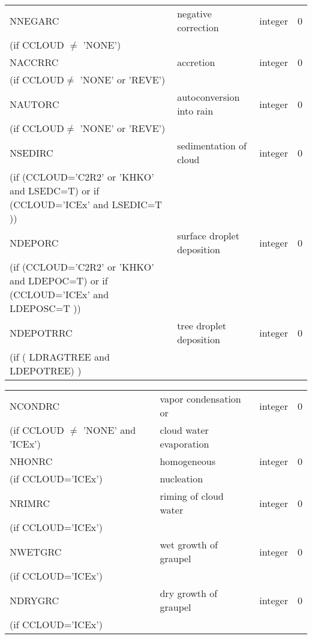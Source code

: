 \begin{center}
\begin{tabular} {|p{8cm}|p{4cm}|>{\centering}p{1.5cm}|p{1.5cm}<{\centering}|}
NNEGARC   & negative correction & integer  &  0 \index{NREVARC!\innam{NAM\_BU\_RRC}}\\
(if CCLOUD $\neq$ 'NONE') & &   &  \\\hline
NACCRRC  & accretion & integer  &  0 \index{NACCRC!\innam{NAM\_BU\_RRC}}\\
(if CCLOUD$ \neq$ 'NONE' or 'REVE') & &   &  \\\hline
NAUTORC  & autoconversion into rain & integer  &  0 \index{NAUTORC!\innam{NAM\_BU\_RRC}}\\
(if CCLOUD$ \neq$ 'NONE' or 'REVE') & &   &  \\\hline
NSEDIRC  & sedimentation of cloud   & integer  &  0 \index{NSEDIRC!\innam{NAM\_BU\_RRC}}\\
(if (CCLOUD='C2R2' or 'KHKO' and LSEDC=T) or if (CCLOUD='ICEx' and LSEDIC=T )) &  &   &   \\\hline
NDEPORC  & surface droplet deposition   & integer  &  0 \index{NDEPORC!\innam{NAM\_BU\_RRC}}\\
(if (CCLOUD='C2R2' or 'KHKO' and LDEPOC=T) or if (CCLOUD='ICEx' and LDEPOSC=T )) &  &   &   \\\hline
NDEPOTRRC  & tree droplet deposition   & integer  &  0 \index{NDEPOTRRC!\innam{NAM\_BU\_RRC}}\\
(if ( LDRAGTREE and LDEPOTREE) ) &  &   &   \\\hline
\end{tabular}
\begin{tabular} {|p{8cm}|p{4cm}|>{\centering}p{1.5cm}|p{1.5cm}<{\centering}|}
\hline
NCONDRC  &vapor condensation or & integer  &  0 \index{NCONDRC!\innam{NAM\_BU\_RRV}}\\
(if CCLOUD $\neq$ 'NONE' and 'ICEx') &cloud water evaporation &   &  \\\hline
NHONRC   & homogeneous   & integer  &  0 \index{NHONRC!\innam{NAM\_BU\_RRC}}\\
(if CCLOUD='ICEx') &nucleation &   &  \\\hline
NRIMRC   & riming of cloud water   & integer  &  0 \index{NRIMRC!\innam{NAM\_BU\_RRC}}\\
(if CCLOUD='ICEx') & &   &  \\\hline
NWETGRC   & wet growth of graupel  & integer  &  0 \index{NWETGRC!\innam{NAM\_BU\_RRC}}\\
(if CCLOUD='ICEx') & &   &  \\\hline
NDRYGRC   & dry growth of graupel & integer  &  0 \index{NDRYGRC!\innam{NAM\_BU\_RRC}}\\
(if CCLOUD='ICEx') & &   &  \\\hline

\end{tabular}
\end{center}
